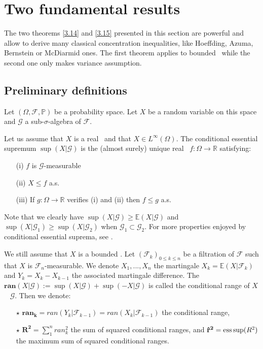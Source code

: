 \section{Two fundamental results}
The two theorems \ref{3.14} and \ref{3.15} presented in this section are powerful and allow to derive many classical concentration inequalities, like
Hoeffding, Azuma, Bernstein or McDiarmid ones. The first theorem applies to bounded \rv~while the second one only makes variance assumption.

\subsection{Preliminary definitions}
Let $(\Omega,\mathcal{F},\mathbb{P})$ be a probability space.
Let $X$ be a random variable on this space and $\mathcal{G}$ a sub-$\sigma$-algebra of $\mathcal{F}$.

\begin{notation} Let us assume that $X$ is a real \rv~and that $X \in L^{\infty}(\Omega)$. The conditional essential supremum $\sup(X|\mathcal{G})$ is the (almost surely) unique real \rv~$f:\Omega \rightarrow \mathbb{R}$ satisfying:
\begin{itemize}
\item[(i)] $f$ is $\mathcal{G}$-measurable
\item[(ii)] $X \leq f$ a.s.
\item[(iii)] If  $g:\Omega \rightarrow \mathbb{R}$ verifies (i) and (ii) then $ f\le g$ a.s.
\end{itemize}
\end{notation}
%
Note that we clearly have $\sup(X|\mathcal{G}) \geq \mathbb{E}(X|\mathcal{G}) $ and  $\sup(X|\mathcal{G}_1) \geq  \sup(X|\mathcal{G}_2) $ when  $ \mathcal{G}_1 \subset \mathcal{G}_2$.
For more properties enjoyed by conditional essential suprema, see \cite{Barron2003}.

\begin{notation}
\label{defpreli1}
We still assume that $X$ is a bounded \rv. Let $(\mathcal{F}_k)_{0\leq k \leq n}$ be a filtration of $\mathcal{F}$ such that $X$ is $\mathcal{F}_n$-measurable. We denote $X_1,...,X_n$ the martingale $X_k=\mathbb{E}(X|\mathcal{F}_k)$ and $Y_k=X_k - X_{k-1}$ the associated martingale difference. The \rv~$\mathbf{ran}(X \vert \mathcal{G}) := \sup(X | \mathcal{G}) + \sup(-X \vert \mathcal{G}) $ is called the conditional range of $X$ \wrt~ $\mathcal{G}$. Then we denote:
\begin{itemize}
\item [$\star$] $ \mathbf{ran_k} = ran (Y_k|\mathcal{F}_{k-1}) = ran(X_k|\mathcal{F}_{k-1})$ the conditional range,
\item [$\star$] $\mathbf{R^2} = \sum_{1}^{n} ran_k^2$  the sum of squared conditional ranges, and $\mathbf{\hat{r}^2} = \supess(R^2)$ the maximum sum of squared conditional ranges.
\end{itemize}
\end{notation}

